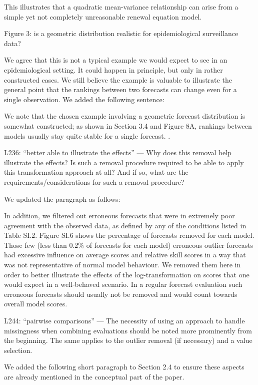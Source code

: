 \documentclass{article}
\newcommand{\black}{\color{black}}
\newcommand{\blue}{\color{blue}}
\newcommand{\indented}{\setlength{\leftskip}{1cm}}
\newcommand{\notindented}{\setlength{\leftskip}{0cm}}
\begin{document}
This illustrates that a quadratic mean-variance relationship can arise from a simple yet not completely unreasonable renewal equation model.

\blue
Figure 3: is a geometric distribution realistic for epidemiological surveillance data?

\black
We agree that this is not a typical example we would expect to see in an epidemiological setting. It could happen in principle, but only in rather constructed cases. We still believe the example is valuable to illustrate the general point that the rankings between two forecasts can change even for a single observation. We added the following sentence:

\indented
We note that the chosen example involving a geometric forecast distribution is somewhat constructed; as shown in Section 3.4 and Figure 8A, rankings between models usually stay quite stable for a single forecast. .

\notindented


\blue
L236: “better able to illustrate the effects” — Why does this removal help illustrate the effects? Is such a removal procedure required to be able to apply this transformation approach at all? And if so, what are the requirements/considerations for such a removal procedure?

\black
We updated the paragraph as follows: 

\indented
In addition, we filtered out erroneous forecasts that were in extremely poor agreement with the observed data, as defined by any of the conditions listed in Table SI.2. Figure SI.6 shows the percentage of forecasts removed for each model. Those few (less than 0.2\%  of forecasts for each model) erroneous outlier forecasts had excessive influence on average scores and relative skill scores in a way that was not representative of normal model behaviour. We removed them here in order to better illustrate the effects of the log-transformation on scores that one would expect in a well-behaved scenario. In a regular forecast evaluation such erroneous forecasts should usually not be removed and would count towards overall model scores.

\notindented

\blue
L244: “pairwise comparisons” — The necessity of using an approach to handle missingness when combining evaluations should be noted more prominently from the beginning. The same applies to the outlier removal (if necessary) and a value selection.

\black
We added the following short paragraph to Section 2.4 to ensure these aspects are already mentioned in the conceptual part of the paper.
\end{document}
